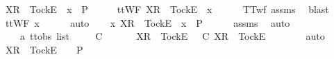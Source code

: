 \begin{isabellebody}
\ {\isachardoublequoteopen}{\isacharbrackleft}X{\isacharbrackright}\isactrlsub R\ {\isacharhash}\ {\isacharbrackleft}Tock{\isacharbrackright}\isactrlsub E\ {\isacharhash}\ x\ {\isasymin}\ P{\isachardoublequoteclose}\isanewline
\ \ \isamarkupfalse%
\ \isamarkupfalse%
\ {\isachardoublequoteopen}ttWF\ {\isacharparenleft}{\isacharbrackleft}X{\isacharbrackright}\isactrlsub R\ {\isacharhash}\ {\isacharbrackleft}Tock{\isacharbrackright}\isactrlsub E\ {\isacharhash}\ x{\isacharparenright}{\isachardoublequoteclose}\isanewline
\ \ \ \ \isamarkupfalse%
\ TT{\isacharunderscore}wf\ assms{\isacharparenleft}{}{\isacharparenright}\ \isamarkupfalse%
\ blast\isanewline
\ \ \isamarkupfalse%
\ \isamarkupfalse%
\ {\isachardoublequoteopen}ttWF\ x{\isachardoublequoteclose}\isanewline
\ \ \ \ \isamarkupfalse%
\ auto\isanewline
{}\isamarkupfalse%
\isanewline
\ \ \isamarkupfalse%
\ {\isachardoublequoteopen}{\isasymexists}x{\isachardot}\ {\isacharbrackleft}X{\isacharbrackright}\isactrlsub R\ {\isacharhash}\ {\isacharbrackleft}Tock{\isacharbrackright}\isactrlsub E\ {\isacharhash}\ x\ {\isasymin}\ P{\isachardoublequoteclose}\isanewline
\ \ \ \ \isamarkupfalse%
\ assms{\isacharparenleft}{}{\isacharparenright}\ \isamarkupfalse%
\ auto\isanewline
{}\isamarkupfalse%
\isanewline
\ \ \isamarkupfalse%
\ {\isasymrho}\ {\isasymsigma}\ {\isacharcolon}{\isacharcolon}\ {\isachardoublequoteopen}{\isacharprime}a\ ttobs\ list{\isachardoublequoteclose}\isanewline
\ \ \isamarkupfalse%
\ {\isachardoublequoteopen}{\isasymrho}\ {\isasymlesssim}\isactrlsub C\ {\isasymsigma}{\isachardoublequoteclose}\isanewline
\ \ \isamarkupfalse%
\ \isamarkupfalse%
\ {\isachardoublequoteopen}{\isacharbrackleft}X{\isacharbrackright}\isactrlsub R\ {\isacharhash}\ {\isacharbrackleft}Tock{\isacharbrackright}\isactrlsub E\ {\isacharhash}\ {\isasymrho}\ {\isasymlesssim}\isactrlsub C\ {\isacharbrackleft}X{\isacharbrackright}\isactrlsub R\ {\isacharhash}\ {\isacharbrackleft}Tock{\isacharbrackright}\isactrlsub E\ {\isacharhash}\ {\isasymsigma}{\isachardoublequoteclose}\isanewline
\ \ \ \ \isamarkupfalse%
\ auto\isanewline
\ \ \isamarkupfalse%
\ \isamarkupfalse%
\ {\isachardoublequoteopen}{\isacharbrackleft}X{\isacharbrackright}\isactrlsub R\ {\isacharhash}\ {\isacharbrackleft}Tock{\isacharbrackright}\isactrlsub E\ {\isacharhash}\ {\isasymsigma}\ {\isasymin}\ P{\isachardoublequoteclose}\isanewline

\end{isabellebody}
